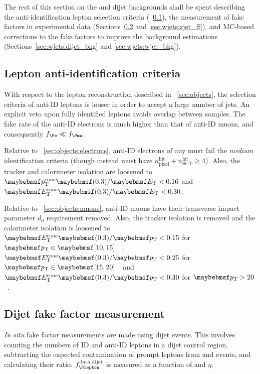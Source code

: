 The rest of this section on the \Wjets and dijet backgrounds shall be spent describing 
the anti-identification lepton selection criteria (\Section~\ref{sec:wjets:antiid}), the 
measurement of fake factors in experimental data (Sections~\ref{sec:wjets:dijet_ff} and 
\ref{sec:wjets:zjet_ff}), and MC-based corrections to the fake factors to improve the 
background estimations (Sections~\ref{sec:wjets:dijet_bkg} and \ref{sec:wjets:wjet_bkg}).



\subsection{Lepton anti-identification criteria}
\label{sec:wjets:antiid}

With respect to the lepton reconstruction described in \Section~\ref{sec:objects}, the 
selection criteria of anti-ID leptons is looser in order to accept a large number of 
jets. An explicit veto upon fully identified leptons avoids overlap between samples. 
The fake rate of the anti-ID electrons is much higher than that of anti-ID muons, and 
consequently $f_{\Pe} \ll f_{\Pmu}$.

Relative to \Section~\ref{sec:objects:electrons}, anti-ID electrons of any \pt must fail 
the \textit{medium} identification criteria (though instead must have 
$n_{\text{pixel}}^{\text{hit}} + n_{\text{SCT}}^{\text{hit}} \geq 4$). Also, the tracker 
and calorimeter isolation are loosened to $\ptcone{0.3}/\et < 0.16$ and 
$\etcone{0.3}/\et < 0.30$.

Relative to \Section~\ref{sec:objects:muons}, anti-ID muons have their transverse impact 
parameter $d_0$ requirement removed. Also, the tracker isolation is removed and the 
calorimeter isolation is loosened to $\etcone{0.3}/\pt < 0.15$ for 
\unit{$\pt \in \hardrange{10,15}$}{\GeV}, $\etcone{0.3}/\pt < 0.25$ for 
\unit{$\pt \in \hardrange{15,20}$}{\GeV} and $\etcone{0.3}/\pt < 0.30$ for 
\unit{$\pt > 20$}{\GeV}.





\subsection{Dijet fake factor measurement}
\label{sec:wjets:dijet_ff}

\textit{In situ} fake factor measurements are made using dijet events. This involves 
counting the numbers of ID and anti-ID leptons in a dijet control region, subtracting the 
expected contamination of prompt leptons from \PW and \PZ events, and calculating their 
ratio. $f_{\Plepton}^{\text{data,dijet}}$ is measured as a function of \pt and $\eta$.

